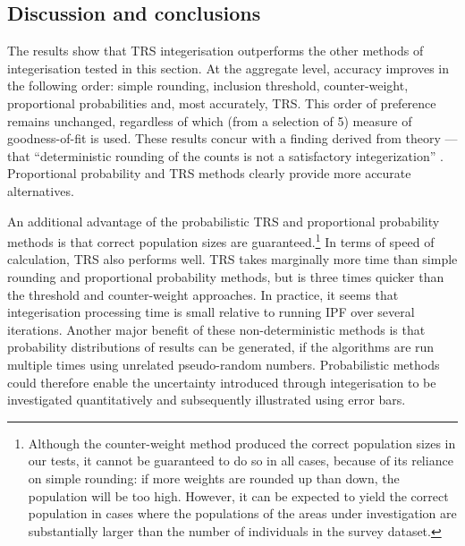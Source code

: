 \documentclass[a4paper, 11pt, twoside]{Thesis}
\begin{document}
\subsection{Discussion and conclusions}
\label{discuss}
The results show that TRS integerisation outperforms the other methods of
integerisation tested in this section.
At the aggregate level, accuracy
improves in the following order: simple rounding,
inclusion threshold, counter-weight, proportional probabilities and, most
accurately, TRS. This order of preference remains unchanged, regardless of which
(from a selection of 5) measure of goodness-of-fit is used. These results
concur with a finding derived from theory --- that ``deterministic rounding of
the counts is not a satisfactory integerization''
\citep[p.~689]{Pritchard2012}.
Proportional probability and TRS methods clearly provide more accurate
alternatives.

An additional advantage of the probabilistic TRS and proportional probability
methods is that correct population sizes are guaranteed.\footnote{Although
the counter-weight method produced the correct population sizes in our tests, it
cannot be guaranteed to do so in all cases, because of its reliance on simple
rounding: if more weights are rounded up than down, the population will be too
high. However, it can be expected to yield the correct population in cases
where the populations of the areas under investigation are substantially
larger than the number of individuals in the survey dataset.}
In terms of speed of calculation, TRS also performs well. TRS takes marginally
more time than simple rounding and proportional probability methods,
but is three times quicker than the threshold and counter-weight
approaches. In practice, it seems that integerisation processing time is
small relative to running IPF over several iterations. Another
major benefit of these non-deterministic methods is that probability
distributions of results can be generated, if the algorithms are run multiple
times using unrelated pseudo-random numbers. Probabilistic methods could
therefore enable the uncertainty introduced through integerisation to be
investigated quantitatively
\citep{Beckman1996, Rubin1987} and subsequently illustrated using error bars.
\end{document}
